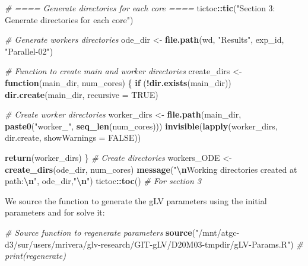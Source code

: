 \documentclass[
]{article}
\newenvironment{Shaded}{\begin{snugshade}}{\end{snugshade}}
\newcommand{\AttributeTok}[1]{\textcolor[rgb]{0.13,0.29,0.53}{#1}}
\newcommand{\CommentTok}[1]{\textcolor[rgb]{0.56,0.35,0.01}{\textit{#1}}}
\newcommand{\ConstantTok}[1]{\textcolor[rgb]{0.56,0.35,0.01}{#1}}
\newcommand{\ControlFlowTok}[1]{\textcolor[rgb]{0.13,0.29,0.53}{\textbf{#1}}}
\newcommand{\FunctionTok}[1]{\textcolor[rgb]{0.13,0.29,0.53}{\textbf{#1}}}
\newcommand{\NormalTok}[1]{#1}
\newcommand{\OtherTok}[1]{\textcolor[rgb]{0.56,0.35,0.01}{#1}}
\newcommand{\SpecialCharTok}[1]{\textcolor[rgb]{0.81,0.36,0.00}{\textbf{#1}}}
\newcommand{\StringTok}[1]{\textcolor[rgb]{0.31,0.60,0.02}{#1}}
\begin{document}
\begin{Shaded}
\begin{Highlighting}[]
\CommentTok{\# ==== Generate directories for each core ====}
\NormalTok{tictoc}\SpecialCharTok{::}\FunctionTok{tic}\NormalTok{(}\StringTok{"Section 3: Generate directories for each core"}\NormalTok{)}

\CommentTok{\# Generate workers directories}
\NormalTok{ode\_dir }\OtherTok{\textless{}{-}} \FunctionTok{file.path}\NormalTok{(wd, }\StringTok{"Results"}\NormalTok{, exp\_id, }\StringTok{"Parallel{-}02"}\NormalTok{)}

\CommentTok{\# Function to create main and worker directories}
\NormalTok{create\_dirs }\OtherTok{\textless{}{-}} \ControlFlowTok{function}\NormalTok{(main\_dir, num\_cores) \{}
  \ControlFlowTok{if}\NormalTok{ (}\SpecialCharTok{!}\FunctionTok{dir.exists}\NormalTok{(main\_dir)) }\FunctionTok{dir.create}\NormalTok{(main\_dir, }\AttributeTok{recursive =} \ConstantTok{TRUE}\NormalTok{)}
  
  \CommentTok{\# Create worker directories}
\NormalTok{  worker\_dirs }\OtherTok{\textless{}{-}} \FunctionTok{file.path}\NormalTok{(main\_dir, }\FunctionTok{paste0}\NormalTok{(}\StringTok{"worker\_"}\NormalTok{, }\FunctionTok{seq\_len}\NormalTok{(num\_cores)))}
  \FunctionTok{invisible}\NormalTok{(}\FunctionTok{lapply}\NormalTok{(worker\_dirs, dir.create, }\AttributeTok{showWarnings =} \ConstantTok{FALSE}\NormalTok{))}
  
  \FunctionTok{return}\NormalTok{(worker\_dirs)}
\NormalTok{\}}
\CommentTok{\# Create directories }
\NormalTok{workers\_ODE }\OtherTok{\textless{}{-}} \FunctionTok{create\_dirs}\NormalTok{(ode\_dir, num\_cores)}
\FunctionTok{message}\NormalTok{(}\StringTok{"}\SpecialCharTok{\textbackslash{}n}\StringTok{Working directories created at path:}\SpecialCharTok{\textbackslash{}n}\StringTok{"}\NormalTok{, ode\_dir,}\StringTok{"}\SpecialCharTok{\textbackslash{}n}\StringTok{"}\NormalTok{)}
\NormalTok{tictoc}\SpecialCharTok{::}\FunctionTok{toc}\NormalTok{() }\CommentTok{\# For section 3}
\end{Highlighting}
\end{Shaded}

We source the function to generate the gLV parameters using the initial
parameters and for solve it:

\begin{Shaded}
\begin{Highlighting}[]
\CommentTok{\# Source function to regenerate parameters}
\FunctionTok{source}\NormalTok{(}\StringTok{"/mnt/atgc{-}d3/sur/users/mrivera/glv{-}research/GIT{-}gLV/D20M03{-}tmpdir/gLV{-}Params.R"}\NormalTok{)}
\CommentTok{\# print(regenerate)}
\end{Highlighting}
\end{Shaded}
\end{document}
